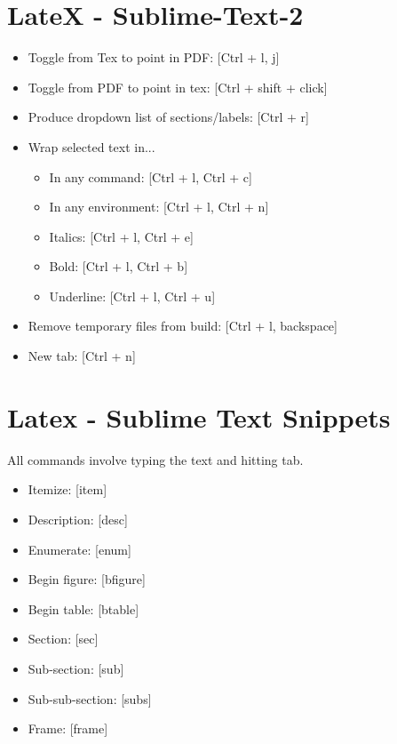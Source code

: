 \documentclass[11pt,twocolumn]{article}
\begin{document}
\section*{LateX - Sublime-Text-2}
\begin{itemize}
	\item Toggle from Tex to point in PDF: [Ctrl + l, j]
	\item Toggle from PDF to point in tex: [Ctrl + shift + click]
	\item Produce dropdown list of sections/labels: [Ctrl + r]
	\item Wrap selected text in...
		\begin{itemize}
		\item In any command: [Ctrl + l, Ctrl + c]
		\item In any environment: [Ctrl + l, Ctrl + n]
		\item Italics: [Ctrl + l, Ctrl + e]
		\item Bold: [Ctrl + l, Ctrl + b]
		\item Underline: [Ctrl + l, Ctrl + u]
		\end{itemize}
	\item Remove temporary files from build: [Ctrl + l, backspace]
	\item New tab: [Ctrl + n]
\end{itemize}

\section{Latex - Sublime Text Snippets} %
All commands involve typing the text and hitting tab.
\begin{itemize}
	\item Itemize: [item]
	\item Description: [desc]
	\item Enumerate: [enum]
	\item Begin figure: [bfigure]
	\item Begin table: [btable]
	\item Section: [sec]
	\item Sub-section: [sub]
	\item Sub-sub-section: [subs]
	\item Frame: [frame]
\end{itemize}
\end{document}
